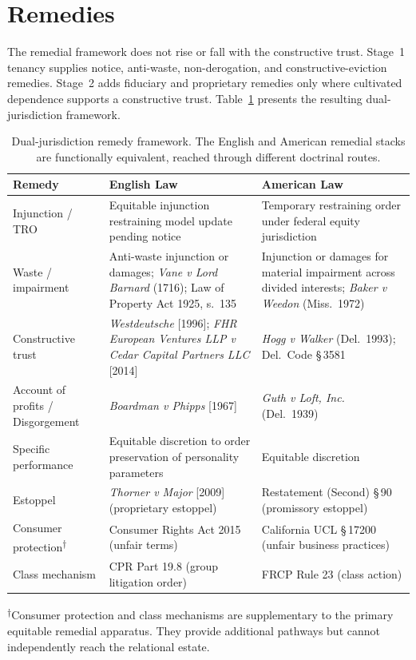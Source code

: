 \section{Remedies}
\label{sec:remedies}

The remedial framework does not rise or fall with the constructive trust. Stage~1 tenancy supplies notice, anti-waste, non-derogation, and constructive-eviction remedies. Stage~2 adds fiduciary and proprietary remedies only where cultivated dependence supports a constructive trust. Table~\ref{tab:remedies} presents the resulting dual-jurisdiction framework.

\begin{table}[h]
\centering
\small
\begin{tabular}{@{}p{2.8cm}p{4.8cm}p{4.8cm}@{}}
\toprule
\textbf{Remedy} & \textbf{English Law} & \textbf{American Law} \\
\midrule
Injunction / TRO & Equitable injunction restraining model update pending notice & Temporary restraining order under federal equity jurisdiction \\
\addlinespace
Waste / impairment & Anti-waste injunction or damages; \emph{Vane v Lord Barnard} (1716); Law of Property Act 1925, s.~135 & Injunction or damages for material impairment across divided interests; \emph{Baker v Weedon} (Miss.\ 1972) \\
\addlinespace
Constructive trust & \emph{Westdeutsche} [1996]; \emph{FHR European Ventures LLP v Cedar Capital Partners LLC} [2014] & \emph{Hogg v Walker} (Del.\ 1993); Del.\ Code \S\,3581 \\
\addlinespace
Account of profits / Disgorgement & \emph{Boardman v Phipps} [1967] & \emph{Guth v Loft, Inc.} (Del.\ 1939) \\
\addlinespace
Specific performance & Equitable discretion to order preservation of personality parameters & Equitable discretion \\
\addlinespace
Estoppel & \emph{Thorner v Major} [2009] (proprietary estoppel) & Restatement (Second) \S\,90 (promissory estoppel) \\
\addlinespace
Consumer protection\textsuperscript{$\dagger$} & Consumer Rights Act 2015 (unfair terms) & California UCL \S\,17200 (unfair business practices) \\
\addlinespace
Class mechanism & CPR Part 19.8 (group litigation order) & FRCP Rule 23 (class action) \\
\bottomrule
\end{tabular}
\vspace{2pt}
{\footnotesize \textsuperscript{$\dagger$}Consumer protection and class mechanisms are supplementary to the primary equitable remedial apparatus. They provide additional pathways but cannot independently reach the relational estate.}
\caption{Dual-jurisdiction remedy framework. The English and American remedial stacks are functionally equivalent, reached through different doctrinal routes.}
\label{tab:remedies}
\end{table}

